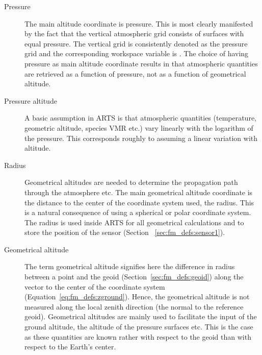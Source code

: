 \begin{description}
  
\item[Pressure] The main altitude coordinate is
  pressure. This is most clearly manifested by the fact that the
  vertical atmospheric grid consists of surfaces with equal pressure.
  The vertical grid is consistently denoted as the pressure grid and
  the corresponding workspace variable is . The
  choice of having pressure as main altitude coordinate results in
  that atmospheric quantities are retrieved as a function of pressure,
  not as a function of geometrical altitude.
  
\item[Pressure altitude] A basic assumption
  in ARTS is that atmospheric quantities (temperature, geometric
  altitude, species VMR etc.) vary linearly with the logarithm of the
  pressure. This corresponds roughly to assuming a linear variation
  with altitude. 
  
\item[Radius] Geometrical altitudes are
  needed to determine the propagation path through the atmosphere etc.
  The main geometrical altitude coordinate is the distance to the
  center of the coordinate system used, the radius. This is a natural
  consequence of using a spherical or polar coordinate system. The
  radius is used inside ARTS for all geometrical calculations and to
  store the position of the sensor (Section~
  \ref{sec:fm_defs:sensor1}).
  
\item[Geometrical altitude] The term
  geometrical altitude signifies here the difference in radius between
  a point and the geoid (Section~\ref{sec:fm_defs:geoid}) along the
  vector to the center of the coordinate system
  (Equation~\ref{eq:fm_defs:zground}). Hence, the geometrical altitude
  is not measured along the local zenith direction (the normal to the
  reference geoid). Geometrical altitudes are mainly used to
  facilitate the input of the ground altitude, the altitude of the
  pressure surfaces etc. This is the case as these quantities are known
  rather with respect to the geoid than with respect to the Earth's
  center.

\end{description}


